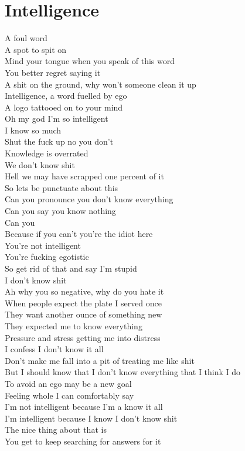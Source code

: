 \documentclass[12pt, b5paper]{article}
\begin{document}
\section{Intelligence}
A foul word
\\A spot to spit on
\\Mind your tongue when you speak of this word
\\You better regret saying it
\\A shit on the ground, why won't someone clean it up
\\Intelligence, a word fuelled by ego
\\A logo tattooed on to your mind
\\Oh my god I'm so intelligent
\\I know so much
\\Shut the fuck up no you don't
\\Knowledge is overrated
\\We don't know shit
\\Hell we may have scrapped one percent of it
\\So lets be punctuate about this
\\Can you pronounce you don't know everything
\\Can you say you know nothing
\\Can you
\\Because if you can't you're the idiot here
\\You're not intelligent
\\You're fucking egotistic
\\So get rid of that and say I'm stupid
\\I don't know shit
\\Ah why you so negative, why do you hate it
\\When people expect the plate I served once
\\They want another ounce of something new
\\They expected me to know everything
\\Pressure and stress getting me into distress
\\I confess I don't know it all
\\Don't make me fall into a pit of treating me like shit
\\But I should know that I don't know everything that I think I do
\\To avoid an ego may be a new goal
\\Feeling whole I can comfortably say
\\I'm not intelligent because I'm a know it all
\\I'm intelligent because I know I don't know shit
\\The nice thing about that is
\\You get to keep searching for answers for it
\end{document}
